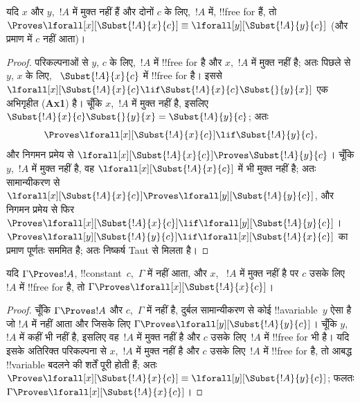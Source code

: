 \documentclass[../../../include/open-logic-section]{subfiles}
\begin{document}
\begin{lem}[आबद्ध चर का परिवर्तन]
यदि $x$ और $y$,~$!A$ में मुक्त नहीं हैं और दोनों $c$ के लिए,~$!A$ में,
!!{free for} हैं, तो $\Proves \lforall[x][\Subst{!A}{x}{c}] \equiv
\lforall[y][\Subst{!A}{y}{c}]$ (और प्रमाण में $c$ नहीं आता)।
\end{lem}

\begin{proof} 
परिकल्पनाओं से $y$, $c$ के लिए,~$!A$ में !!{free for} है और $x$,~$!A$ में
मुक्त नहीं है; अतः पिछले  से $y$, $x$ के लिए,
~$\Subst{!A}{x}{c}$ में !!{free for} है। इससे
$\lforall[x][\Subst{!A}{x}{c} \lif \Subst{!A}{x}{c} \Subst{}{y}{x}]$
एक अभिगृहीत (\textbf{Ax1}) है। चूँकि $x$,~$!A$ में मुक्त नहीं है, इसलिए
$\Subst{!A}{x}{c} \Subst{}{y}{x} = \Subst{!A}{y}{c}$; अतः
\[
\Proves \lforall[x][\Subst{!A}{x}{c}] \lif \Subst{!A}{y}{c}, 
\] 
और निगमन प्रमेय से $\lforall[x][\Subst{!A}{x}{c}] \Proves
\Subst{!A}{y}{c}$। चूँकि $y$,~$!A$ में मुक्त नहीं है, वह
$\lforall[x][\Subst{!A}{x}{c}]$ में भी मुक्त नहीं है; अतः सामान्यीकरण से
$\lforall[x][\Subst{!A}{x}{c}] \Proves \lforall[y][\Subst{!A}{y}{c}]$,
और निगमन प्रमेय से फिर $\Proves
\lforall[x][\Subst{!A}{x}{c}] \lif \lforall[y][\Subst{!A}{y}{c}]$।
$\Proves \lforall[y][\Subst{!A}{y}{c}] \lif \lforall[x]
[\Subst{!A}{x}{c}]$ का प्रमाण पूर्णतः सममित है; अतः निष्कर्ष Taut से मिलता है।
\end{proof}

\begin{thm}
यदि $\Gamma \Proves !A$, !!{constant}~$c$,~$\Gamma$ में नहीं आता, और $x$,
~$!A$ में मुक्त नहीं है पर $c$ उसके लिए~$!A$ में !!{free for} है, तो
$\Gamma \Proves \lforall[x][\Subst{!A}{x}{c}]$।
\end{thm}

\begin{proof} 
चूँकि $\Gamma \Proves !A$ और $c$,~$\Gamma$ में नहीं है, दुर्बल सामान्यीकरण
से कोई !!a{variable}~$y$ ऐसा है जो $!A$ में नहीं आता और जिसके लिए
$\Gamma \Proves \lforall[y][\Subst{!A}{y}{c}]$। चूँकि $y$,~$!A$ में कहीं
भी नहीं है, इसलिए वह~$!A$ में मुक्त नहीं है और $c$ उसके लिए~$!A$ में
!!{free for} भी है। यदि इसके अतिरिक्त परिकल्पना से $x$,~$!A$ में मुक्त नहीं
है और $c$ उसके लिए~$!A$ में !!{free for} है, तो आबद्ध !!{variable} बदलने की
शर्तें पूरी होती हैं; अतः
$\Proves \lforall[x][\Subst{!A}{x}{c}] \equiv
\lforall[y][\Subst{!A}{y}{c}]$; फलतः $\Gamma \Proves
\lforall[x][\Subst{!A}{x}{c}]$।
\end{proof}
\end{document}

